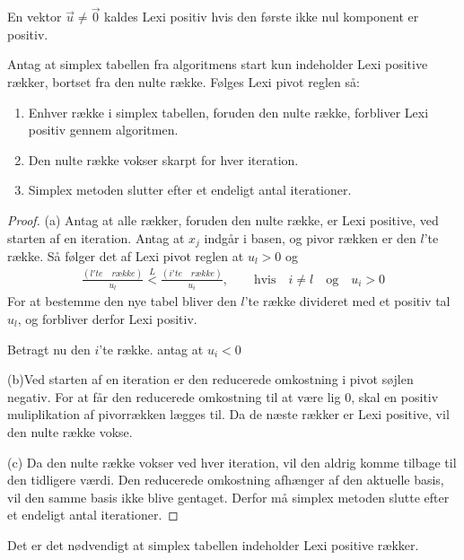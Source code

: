 \begin{defn}
En vektor $\vec{u} \neq \vec{0}$ kaldes Lexi positiv hvis den første ikke nul komponent er positiv. 
\end{defn}

 
\begin{stn}
Antag at simplex tabellen fra algoritmens start kun indeholder Lexi positive rækker, bortset fra den nulte række. Følges Lexi pivot reglen så: 
\begin{enumerate}[label=(\alph*)]
\item Enhver række i simplex tabellen, foruden den nulte række, forbliver Lexi positiv gennem algoritmen. 
\item Den nulte række vokser skarpt for hver iteration. 
\item Simplex metoden slutter efter et endeligt antal iterationer. 
\end{enumerate}
\end{stn}

\begin{proof}
(a) Antag at alle rækker, foruden den nulte række, er Lexi positive, ved starten af en iteration. Antag at $x_j$ indgår i basen, og pivor rækken er den $l$'te række. Så følger det af Lexi pivot reglen at $u_l>0$ og
\begin{align}
\frac{(l'te \quad række)}{u_l} \overset{L}{<} \frac{(i'te \quad række)}{u_i}, \quad \quad \text{hvis} \quad  i \neq l \quad \text{og} \quad u_i>0
\end{align}
For at bestemme den nye tabel bliver den $l$'te række divideret med et positiv tal $u_l$, og forbliver derfor Lexi positiv. 

Betragt nu den $i$'te række. antag at $u_i<0$


(b)Ved starten af en iteration er den reducerede omkostning i pivot søjlen negativ. For at får den reducerede omkostning til at være lig $0$, skal en positiv muliplikation af pivorrækken lægges til. Da de næste rækker er Lexi positive, vil den nulte række vokse. 


(c) Da den nulte række vokser ved hver iteration, vil den aldrig komme tilbage til den tidligere værdi. Den reducerede omkostning afhænger af den aktuelle basis, vil den samme basis ikke blive gentaget. Derfor må simplex metoden slutte efter et endeligt antal iterationer. 
\end{proof}

Det er det nødvendigt at simplex tabellen indeholder Lexi positive rækker. 